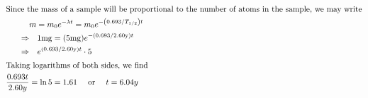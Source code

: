 \begin{enumerate}[ label=\color{ocre}\textbf{\arabic*.}]
\begin{answer}
		\begin{align*}
		\intertext{Since the mass of a sample will be proportional to the number of atoms in the sample, we may write}
		&m=m_{0} e^{-\lambda t}=m_{0} e^{-\left(0.693 / T_{1 / 2}\right) t}\\
		\Rightarrow &\quad 1 \mathrm{mg}=(5 \mathrm{mg}) e^{-(0.693 / 2.60 \mathrm{y}) t}\\
		\Rightarrow &\quad e^{(0.693 / 2.60 \mathrm{y}) t} \cdot 5\\
		\intertext{Taking logarithms of both sides, we find}
		\frac{0.693 t}{2.60 {y}}&=\ln 5=1.61 \quad\text{ or }\quad t=6.04 y
		\end{align*}
	\end{answer}
\end{enumerate}
